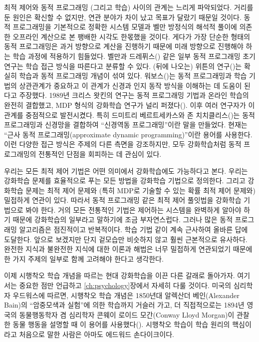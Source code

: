 최적 제어와 동적 프로그래밍 (그리고 학습) 사이의 관계는 느리게 파악되었다.
거리를 둔 원인은 확신할 수 없지만, 연관 분야가 차이 났고 목표가 달랐기 때문일
것이다. 동적 프로그래밍을 기본적으로 정확한 시스템 모델과 벨만 방정식의 해석적
풀이에 의존한 오프라인 계산으로 본 팽배한 시각도 한몫했을 것이다. 게다가 가장
단순한 형태의 동적 프로그래밍은 과거 방향으로 계산을 진행하기 때문에 미래
방향으로 진행해야 하는 학습 과정에 적용하기 힘들었다. 벨만과
드레퓌스(\cite{BellmanDreyfus1959}) 같은 일부 동적 프로그래밍 초기 연구는 학습
접근 방식을 따른다고 분류할 수 있다. (뒤에 나오는) 위튼의
연구(\cite{Witten1977})는 확실히 학습과 동적 프로그래밍 개념이 섞여 있다.
워보스(\cite{Werbos1987})는 동적 프로그래밍과 학습 기법의 상관관계가 중요하고 이
관계가 신경과 인지 동작 방식을 이해하는 데 도움이 된다고 주장했다. 1989년 크리스
왓킨의 연구는 동적 프로그래밍 기법과 온라인 학습의 완전히 결합했고, MDP 형식의
강화학습 연구가 널리 퍼졌다(\cite{Watkins1989}). 이후 여러 연구자가 이 관계를
중점적으로 발전시켰다. 특히 드미트리 베르트세카스와 존
치치클리스(\cite{BertsekasTsitsiklis1996})는 동적 프로그래밍과 신경망을 결합하여
``신경역동 프로그래밍''이란 말을 만들었다. 현재는 ``근사 동적
프로그래밍(approximate dynamic programming)''이란 용어를 사용한다. 이런 다양한
접근 방식은 주제의 다른 측면을 강조하지만, 모두 강화학습처럼 동적 프로그래밍의
전통적인 단점을 회피하는 데 관심이 있다.


우리는 모든 최적 제어 기법은 어떤 의미에서 강화학습에도 가능하다고
본다. 우리는 강화학습 문제를 효율적으로 푸는 모든 방법을 강화학습 기법으로
정의한다. 그리고 강화학습 문제는 최적 제어 문제와 (특히 MDP로 기술할 수 있는
확률 최적 제어 문제와) 밀접하게 연관이 있다. 따라서 동적 프로그래밍 같은 최적
제어 풀잇법을 강화학습 기법으로 봐야 한다. 거의 모든 전통적인 기법은 제어하는
시스템을 완벽하게 알아야 하기 때문에 강화학습의 일부라고 말하기에 조금
부자연스럽다. 그러나 많은 동적 프로그래밍 알고리즘은 점진적이고 반복적이다. 학습
기법 같이 계속 근사하여 올바른 답에 도달한다. 앞으로 보겠지만 단지 겉모습만
비슷하지 않고 훨씬 근본적으로 유사하다. 완전한 지식과 불완전한 지식에 대한
이론과 해법은 너무 밀접하게 연관되었기 때문에 한 가지 주제의 일부로 함께
고려해야 한다고 생각한다.

이제 시행착오 학습 개념을 따르는 현대 강화학습을 이끈 다른 갈래로 돌아가자.
여기서는 중요한 점만 언급하고 \ref{ch:psychology}장에서 자세히 다룰 것이다.
미국의 심리학자 우드워스에 따르면, 시행착오 학습 개념은 1850년대 알렉산더
베인(Alexander Bain)의 ``암중모색과 실험''에 의한 학습까지 거슬러 가고, 더
직접적으로는 1894년 영국의 동물행동학자 겸 심리학자 콘웨이 로이드 모간(Conway
Lloyd Morgan)이 관찰한 동물 행동을 설명할 때 이 용어를
사용했다(\cite{Woodworth1938}). 시행착오 학습이 학습 원리의 핵심이라고 처음으로
말한 사람은 아마도 에드워드 손다이크이다.

